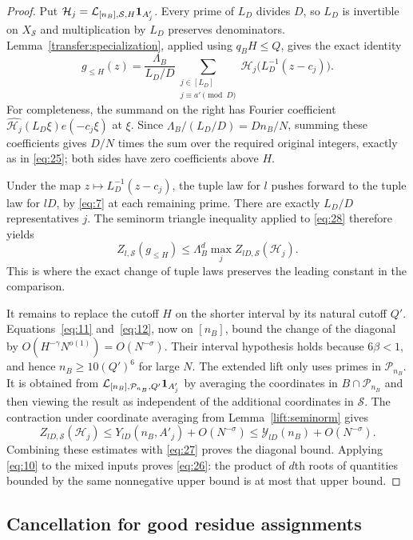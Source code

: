 \begin{proof}
Put $\mathcal H_j=\mathcal L_{[n_B],\mathcal S,H}\mathbf 1_{A'_j}$.
Every prime of $L_D$ divides $D$, so $L_D$ is invertible on
$X_{\mathcal S}$ and multiplication by $L_D$ preserves denominators.
Lemma~\ref{transfer:specialization}, applied using $q_BH\le Q$, gives
the exact identity
\begin{equation}\label{eq:28}
 g_{\le H}(z)
 =\frac{\Lambda_B}{L_D/D}
   \sum_{\substack{j\in[L_D]\\j\equiv a'\pmod D}}
    \mathcal H_j\bigl(L_D^{-1}(z-c_j)\bigr).
\end{equation}
For completeness, the summand on the right has Fourier coefficient
$\widehat{\mathcal H_j}(L_D\xi)e(-c_j\xi)$ at $\xi$.
Since $\Lambda_B/(L_D/D)=Dn_B/N$, summing these coefficients gives
$D/N$ times the sum over the required original integers, exactly as in
\eqref{eq:25}; both sides have zero coefficients above $H$.

Under the map $z\mapsto L_D^{-1}(z-c_j)$, the tuple law for $l$ pushes
forward to the tuple law for $lD$, by \eqref{eq:7} at each remaining
prime.  There are exactly $L_D/D$ representatives $j$.
The seminorm triangle inequality applied to \eqref{eq:28}
therefore yields
\[
 Z_{l,\mathcal S}(g_{\le H})
 \le\Lambda_B^d\max_j Z_{lD,\mathcal S}(\mathcal H_j).
\]
This is where the exact change of tuple laws preserves the leading
constant in the comparison.

It remains to replace the cutoff $H$ on the shorter interval by its
natural cutoff $Q'$.  Equations~\eqref{eq:11} and~\eqref{eq:12}, now
on $[n_B]$, bound the change of the diagonal by
$O(H^{-\gamma}N^{o(1)})=O(N^{-\sigma})$.
Their interval hypothesis holds because $6\beta<1$, and hence
$n_B\ge10(Q')^6$ for large $N$.
The extended lift only uses primes in $\mathcal P_{n_B}$.
It is obtained from
$\mathcal L_{[n_B],\mathcal P_{n_B},Q'}\mathbf 1_{A'_j}$ by averaging the
coordinates in $B\cap\mathcal P_{n_B}$ and then viewing the result
as independent of the additional coordinates in $\mathcal S$.
The contraction under coordinate averaging from
Lemma~\ref{lift:seminorm} gives
\[
 Z_{lD,\mathcal S}(\mathcal H_j)
 \le Y_{lD}(n_B,A'_j)+O(N^{-\sigma})
 \le\mathcal Y_{lD}(n_B)+O(N^{-\sigma}).
\]
Combining these estimates with \eqref{eq:27} proves the diagonal bound.
Applying \eqref{eq:10} to the mixed inputs proves \eqref{eq:26}:
the product of $d$th roots of quantities bounded by the same nonnegative
upper bound is at most that upper bound.
\end{proof}

\subsection{Cancellation for good residue assignments}

